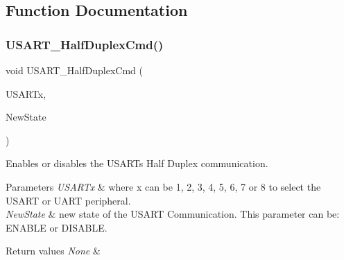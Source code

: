 \subsection{Function Documentation}
\mbox{\label{group___u_s_a_r_t___group5_gaaa23b05fe0e1896bad90da7f82750831}} 
\subsubsection{\texorpdfstring{U\+S\+A\+R\+T\+\_\+\+Half\+Duplex\+Cmd()}{USART\_HalfDuplexCmd()}}
{\footnotesize\ttfamily void U\+S\+A\+R\+T\+\_\+\+Half\+Duplex\+Cmd (\begin{DoxyParamCaption}\item[{U\+S\+A\+R\+T\+\_\+\+Type\+Def $\ast$}]{U\+S\+A\+R\+Tx,  }\item[{Functional\+State}]{New\+State }\end{DoxyParamCaption})}



Enables or disables the U\+S\+A\+RT\textquotesingle{}s Half Duplex communication. 


\begin{DoxyParams}{Parameters}
{\em U\+S\+A\+R\+Tx} & where x can be 1, 2, 3, 4, 5, 6, 7 or 8 to select the U\+S\+A\+RT or U\+A\+RT peripheral. \\
\hline
{\em New\+State} & new state of the U\+S\+A\+RT Communication. This parameter can be\+: E\+N\+A\+B\+LE or D\+I\+S\+A\+B\+LE. \\
\hline
\end{DoxyParams}

\begin{DoxyRetVals}{Return values}
{\em None} & \\
\hline
\end{DoxyRetVals}
